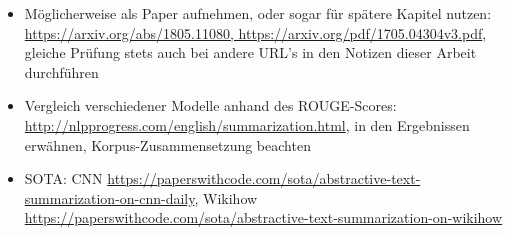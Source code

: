 \begin{itemize}
	\item Möglicherweise als Paper aufnehmen, oder sogar für spätere Kapitel nutzen: \url{https://arxiv.org/abs/1805.11080, https://arxiv.org/pdf/1705.04304v3.pdf}, gleiche Prüfung stets auch bei andere URL's in den Notizen dieser Arbeit durchführen
	\item Vergleich verschiedener Modelle anhand des ROUGE-Scores: \url{http://nlpprogress.com/english/summarization.html}, in den Ergebnissen erwähnen, Korpus-Zusammensetzung beachten
	\item SOTA: CNN \url{https://paperswithcode.com/sota/abstractive-text-summarization-on-cnn-daily}, Wikihow \url{https://paperswithcode.com/sota/abstractive-text-summarization-on-wikihow}
\end{itemize}
